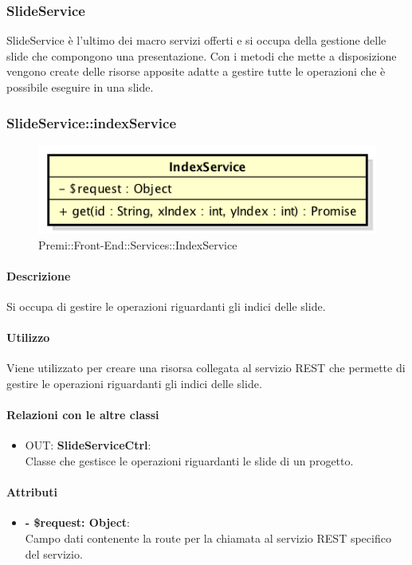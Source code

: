\subsubsection{SlideService}
SlideService è l'ultimo dei macro servizi offerti e si occupa della gestione delle \gls{slide} che compongono una presentazione. Con i metodi che mette a disposizione vengono create delle risorse apposite adatte a gestire tutte le operazioni che è possibile eseguire in una \gls{slide}.


		\subsubsection{SlideService::indexService}
		\begin{figure}[h]
			\centering
				\includegraphics[width=0.4\linewidth]{img/premi_front_end_services_indexservice}
			\caption[Premi::Front-End::Services::IndexService]{Premi::Front-End::Services::IndexService}
		\end{figure}
		
		\paragraph{Descrizione}
		Si occupa di gestire le operazioni riguardanti gli indici delle \gls{slide}.
		
		\paragraph{Utilizzo}
		Viene utilizzato per creare una risorsa collegata al servizio \gls{REST} che permette di gestire le operazioni riguardanti gli indici delle \gls{slide}.
		
		\paragraph{Relazioni con le altre classi}
		\begin{itemize}
			\item OUT: \textbf{SlideServiceCtrl}:\\
			Classe che gestisce le operazioni riguardanti le \gls{slide} di un progetto.
		\end{itemize}
		
		\paragraph{Attributi}
		\begin{itemize}
			\item \textbf{- \$request: Object}:\\
			Campo dati contenente la route per la chiamata al servizio \gls{REST} specifico del servizio.
		\end{itemize}	
		
